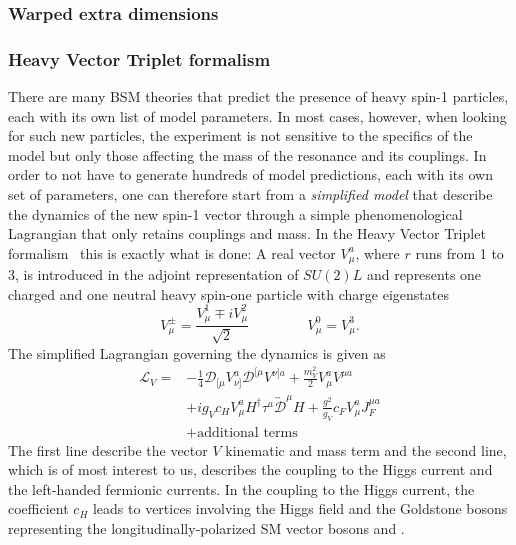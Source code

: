 \subsubsection{Warped extra dimensions}
\label{sec:theory:wed}

\subsubsection{Heavy Vector Triplet formalism}
\label{sec:theory:hvt}
There are many BSM theories that predict the presence of heavy spin-1 particles, each with its own list of model parameters. In most cases, however, when looking for such new particles, the experiment is not sensitive to the specifics of the model but only those affecting the mass of the resonance and its couplings. In order to not have to generate hundreds of model predictions, each with its own set of parameters, one can therefore start from a \emph{simplified model} that describe the dynamics of the new spin-1 vector through a simple phenomenological Lagrangian that only retains couplings and mass. In the Heavy Vector Triplet formalism~\cite{Pappadopulo:2014qza} this is exactly what is done: A real vector $V_{\mu}^a$, where $r$ runs from 1 to 3, is introduced in the adjoint representation of $SU(2)L$ and represents one charged
and one neutral heavy spin-one particle with charge eigenstates
\begin{equation}\label{eqn:HVT_1}
V^\pm_\mu = \frac{V^1_\mu \mp iV^2_\mu}{\sqrt{2}} \, \qquad\qquad V^0_\mu = V^3_\mu.
\end{equation}
The simplified Lagrangian governing the dynamics is given as
\begin{equation}
\begin{split}
\mathcal{L}_V = & -\frac{1}{4}\mathcal{D}_{[\mu}V^a_{\nu]}\mathcal{D}^{[\mu}V^{\nu]a} + \frac{m^2_V}{2}V^a_\mu V^{\mu a}\\
 & + ig_Vc_HV^a_\mu H^\dag\tau^a\overleftrightarrow{\mathcal{D}}^\mu H + \frac{g^2}{g_V}c_FV^a_\mu J^{\mu a}_F\\
 & + \mbox{additional terms}
 \end{split}
\end{equation}
The first line describe the vector $V$ kinematic and mass term and the second line, which is of most interest to us, describes the coupling to the Higgs current and the left-handed fermionic currents.
In the coupling to the Higgs current, the coefficient $c_H$ leads to vertices involving the Higgs field and the Goldstone bosons representing the longitudinally-polarized SM vector bosons \PW and \PZ.
